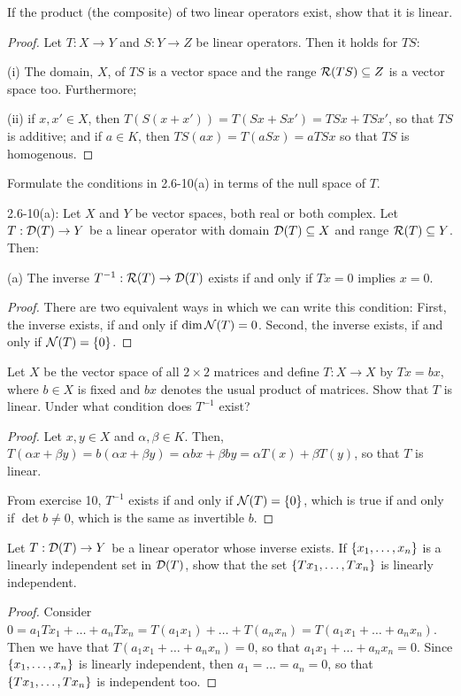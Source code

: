 \begin{exercise}{6}
If the product (the composite) of two linear operators exist, show that it is linear.
\end{exercise}
\begin{proof}
Let $T:X\to Y$ and $S:Y\to Z$ be linear operators. Then it holds for $TS$:

(i) The domain, $X$, of $TS$ is a vector space and the range $\mathcal{R}(TS)\subseteq Z$ is a vector space too. Furthermore;

(ii) if $x,x'\in X$, then $T(S(x+x')) =T(Sx+Sx') =TSx+TSx'$, so that $TS$ is additive; and if $a\in K$, then $TS(ax) =T(aSx) =aTSx$ so that $TS$ is homogenous.
\end{proof}

\begin{exercise}{10}
Formulate the conditions in 2.6-10(a) in terms of the null space of $T$.

2.6-10(a): Let $X$ and $Y$ be vector spaces, both real or both complex. Let $T:\mathcal{D}(T)\to Y$ be a linear operator with domain $\mathcal{D}(T)\subseteq X$ and range $\mathcal{R}(T)\subseteq Y$. Then:

(a) The inverse $T^{-1}:\mathcal{R}(T)\to\mathcal{D}(T)$ exists if and only if $Tx=0$ implies $x=0$.
\end{exercise}
\begin{proof}
There are two equivalent ways in which we can write this condition: First, the inverse exists, if and only if $\dim\mathcal{N}(T)=0$. Second, the inverse exists, if and only if $\mathcal{N}(T)=\{0\}$.
\end{proof}

\begin{exercise}{11}
Let $X$ be the vector space of all $2\times 2$ matrices and define $T:X\to X$ by $Tx=bx$, where $b\in X$ is fixed and $bx$ denotes the usual product of matrices. Show that $T$ is linear. Under what condition does $T^{-1}$ exist?
\end{exercise}
\begin{proof}
Let $x,y\in X$ and $\alpha,\beta\in K$. Then, $T(\alpha x+\beta y) =b(\alpha x+\beta y) =\alpha bx+\beta by =\alpha T(x)+\beta T(y)$, so that $T$ is linear. 

From exercise 10, $T^{-1}$ exists if and only if $\mathcal{N}(T)=\{0\}$, which is true if and only if $\det b\neq 0$, which is the same as invertible $b$.
\end{proof}

\begin{exercise}{13}
Let $T:\mathcal{D}(T)\to Y$ be a linear operator whose inverse exists. If $\{x_1,\dots,x_n\}$ is a linearly independent set in $\mathcal{D}(T)$, show that the set $\{Tx_1,\dots,Tx_n\}$ is linearly independent.
\end{exercise}
\begin{proof}
Consider $0 =a_1Tx_1+\dots+a_nTx_n =T(a_1x_1)+\dots+T(a_nx_n) =T(a_1x_1+\dots+a_nx_n)$. Then we have that $T(a_1x_1+\dots+a_nx_n)=0$, so that $a_1x_1+\dots+a_nx_n=0$. Since $\{x_1,\dots,x_n\}$ is linearly independent, then $a_1=\dots=a_n=0$, so that $\{Tx_1,\dots,Tx_n\}$ is independent too.
\end{proof}

